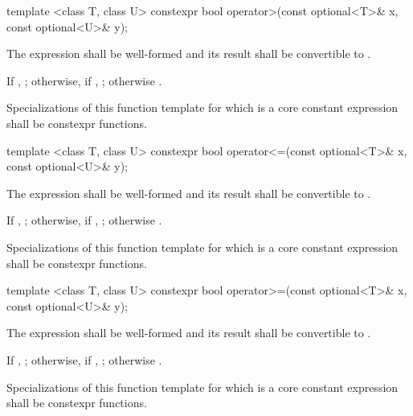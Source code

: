 %
\begin{itemdecl}
template <class T, class U> constexpr bool operator>(const optional<T>& x, const optional<U>& y);
\end{itemdecl}

\begin{itemdescr}
\pnum
\requires
The expression  shall be well-formed and
its result shall be convertible to .

\pnum
\returns
If , ;
otherwise, if , ;
otherwise .

\pnum
\remarks
Specializations of this function template
for which  is a core constant expression
shall be constexpr functions.
\end{itemdescr}

%
\begin{itemdecl}
template <class T, class U> constexpr bool operator<=(const optional<T>& x, const optional<U>& y);
\end{itemdecl}

\begin{itemdescr}
\pnum
\requires
The expression  shall be well-formed and
its result shall be convertible to .

\pnum
\returns
If , ;
otherwise, if , ;
otherwise .

\pnum
\remarks
Specializations of this function template
for which  is a core constant expression
shall be constexpr functions.
\end{itemdescr}

%
\begin{itemdecl}
template <class T, class U> constexpr bool operator>=(const optional<T>& x, const optional<U>& y);
\end{itemdecl}

\begin{itemdescr}
\pnum
\requires
The expression  shall be well-formed and
its result shall be convertible to .

\pnum
\returns
If , ;
otherwise, if , ;
otherwise .

\pnum
\remarks
Specializations of this function template
for which  is a core constant expression
shall be constexpr functions.
\end{itemdescr}

